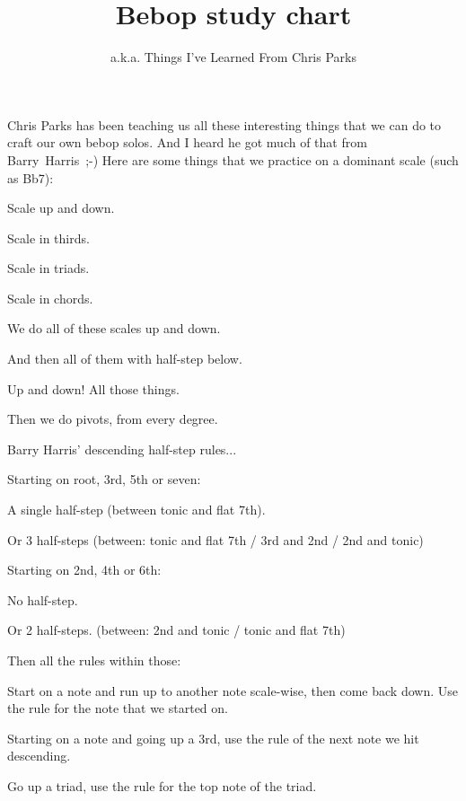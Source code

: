 \documentclass[a4paper,10pt,english]{article}
\title{\vspace{-5cm}Bebop study chart}
\author{\small a.k.a. Things I've Learned From Chris Parks}
\begin{document}
\maketitle
Chris Parks has been teaching us all these interesting things that we can do to craft our own bebop solos. And I heard he got much of that from Barry~Harris~;-)
\linebreak
\linebreak
Here are some things that we practice on a dominant scale (such as Bb7):

  \begin{todolist}
    \item Scale up and down.
    \item Scale in thirds.
    \item Scale in triads.
    \item Scale in chords.
    \item We do all of these scales up and down.
    \item And then all of them with half-step below.
    \item Up and down! All those things.
    \item Then we do pivots, from every degree.
    \item Barry Harris' descending half-step rules...
    \item Starting on root, 3rd, 5th or seven:
    \begin{todolist}
      \item A single half-step (between tonic and flat 7th).
      \item Or 3 half-steps (between: tonic and flat 7th / 3rd and 2nd / 2nd and tonic)
    \end{todolist}
    \item Starting on 2nd, 4th or 6th:
    \begin{todolist}
      \item No half-step.
      \item Or 2 half-steps. (between: 2nd and tonic / tonic and flat 7th)
    \end{todolist}
    \item Then all the rules within those:
    \begin{todolist}
    \item Start on a note and run up to another note scale-wise, then come back down. Use the rule for the note that we started on.
    \item Starting on a note and going up a 3rd, use the rule of the next note we hit descending.
    \item Go up a triad, use the rule for the top note of the triad.

\end{todolist}
\end{todolist}
\end{document}
